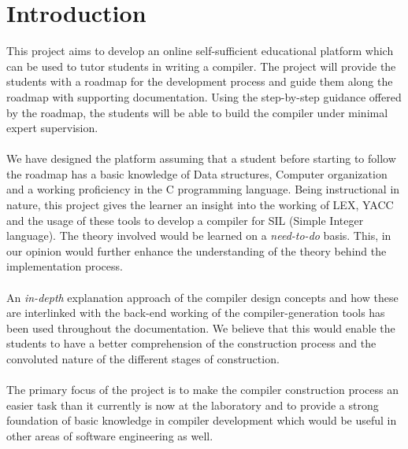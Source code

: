 \chapter{Introduction}

This project aims to develop an online self-sufficient educational platform which can be used to tutor students in writing a compiler. The project will provide the students with a roadmap for the development process and guide them along the roadmap with supporting documentation. Using the step-by-step guidance offered by the roadmap, the students will be able to build the compiler under minimal expert supervision.
\\
\\
We have designed the platform assuming that a student before starting to follow the roadmap has a basic knowledge of Data structures, Computer organization and a working proficiency in the C programming language. Being instructional in nature, this project gives the learner an insight into the working of LEX, YACC and the usage of these tools to develop a compiler for SIL (Simple Integer language). The theory involved would be learned on a \textit{need-to-do} basis. This, in our opinion would further enhance the understanding of the theory behind the implementation process.
\\
\\
An \textit{in-depth} explanation approach of the compiler design concepts and how these are interlinked with the back-end working of the compiler-generation tools has been used throughout the documentation. We believe that this would enable the students to have a better comprehension of the construction process and the convoluted nature of the different stages of construction. 
\\
\\
The primary focus of the project is to make the compiler construction process an easier task than it currently is now at the laboratory and to provide a strong foundation of basic knowledge in compiler development which would be useful in other areas of software engineering as well.
              